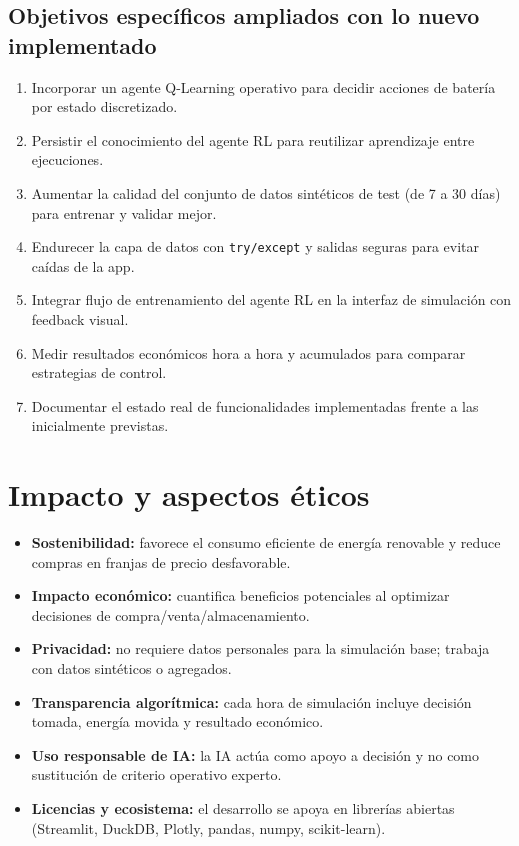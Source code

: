 \documentclass[12pt,a4paper]{article}
\begin{document}
\subsection{Objetivos espec\'ificos ampliados con lo nuevo implementado}
\begin{enumerate}
    \item Incorporar un agente Q-Learning operativo para decidir acciones de bater\'ia por estado discretizado.
    \item Persistir el conocimiento del agente RL para reutilizar aprendizaje entre ejecuciones.
    \item Aumentar la calidad del conjunto de datos sint\'eticos de test (de 7 a 30 d\'ias) para entrenar y validar mejor.
    \item Endurecer la capa de datos con \texttt{try/except} y salidas seguras para evitar ca\'idas de la app.
    \item Integrar flujo de entrenamiento del agente RL en la interfaz de simulaci\'on con feedback visual.
    \item Medir resultados econ\'omicos hora a hora y acumulados para comparar estrategias de control.
    \item Documentar el estado real de funcionalidades implementadas frente a las inicialmente previstas.
\end{enumerate}

\section{Impacto y aspectos \'eticos}
\begin{itemize}
    \item \textbf{Sostenibilidad:} favorece el consumo eficiente de energ\'ia renovable y reduce compras en franjas de precio desfavorable.
    \item \textbf{Impacto econ\'omico:} cuantifica beneficios potenciales al optimizar decisiones de compra/venta/almacenamiento.
    \item \textbf{Privacidad:} no requiere datos personales para la simulaci\'on base; trabaja con datos sint\'eticos o agregados.
    \item \textbf{Transparencia algor\'itmica:} cada hora de simulaci\'on incluye decisi\'on tomada, energ\'ia movida y resultado econ\'omico.
    \item \textbf{Uso responsable de IA:} la IA act\'ua como apoyo a decisi\'on y no como sustituci\'on de criterio operativo experto.
    \item \textbf{Licencias y ecosistema:} el desarrollo se apoya en librer\'ias abiertas (Streamlit, DuckDB, Plotly, pandas, numpy, scikit-learn).
\end{itemize}
\end{document}
